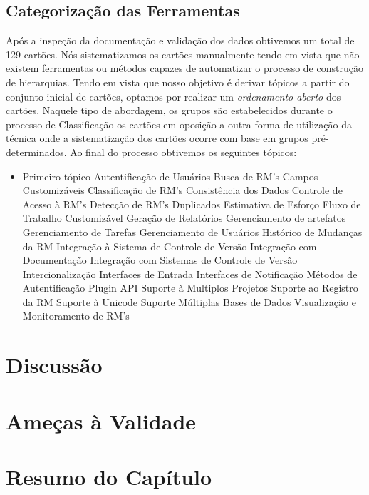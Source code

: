 \subsection{Categorização das Ferramentas}
\label{subsec:categorizacao_ferramentas}

Após a inspeção da documentação e validação dos dados obtivemos um total de 129
cartões. Nós sistematizamos os cartões manualmente tendo em vista que não
existem ferramentas ou métodos capazes de automatizar o processo de construção
de hierarquias. Tendo em vista que nosso objetivo é derivar tópicos a partir do
conjunto inicial de cartões, optamos por realizar um \textit{ordenamento aberto}
dos cartões.  Naquele tipo de abordagem, os grupos são estabelecidos durante o
processo de Classificação os cartões em oposição a outra forma de utilização da
técnica onde a sistematização dos cartões ocorre com base em grupos
pré-determinados.  Ao final do processo obtivemos os seguintes tópicos:

\begin{itemize}
	\item Primeiro tópico
Autentificação de Usuários
Busca de RM's
Campos Customizáveis
Classificação de RM's
Consistência dos Dados
Controle de Acesso à RM's
Detecção de RM's Duplicados
Estimativa de Esforço
Fluxo de Trabalho Customizável
Geração de Relatórios
Gerenciamento de artefatos
Gerenciamento de Tarefas
Gerenciamento de Usuários
Histórico de Mudanças da RM
Integração à Sistema de Controle de Versão
Integração com Documentação
Integração com Sistemas de Controle de Versão
Intercionalização
Interfaces de Entrada
Interfaces de Notificação
Métodos de Autentificação
Plugin API
Suporte à Multiplos Projetos
Suporte ao Registro da RM
Suporte à Unicode
Suporte Múltiplas Bases de Dados
Visualização e Monitoramento de RM's

\end{itemize}

\section{Discussão}
\label{sec:discussao}

\section{Ameças à Validade}
\label{sec:ameacas_a_validade}


\section{Resumo do Capítulo}
\label{sec:resumo_do_capitulo}